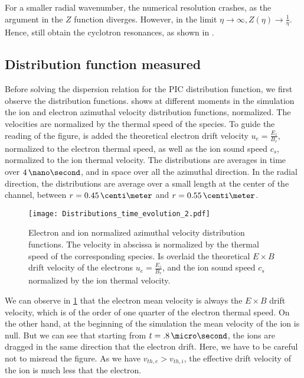     For a smaller radial wavenumber, the numerical resolution crashes, as the argument in the $Z$ function diverges.
    However, in the limit $\eta \rightarrow \infty, Z(\eta) \rightarrow  \frac{1}{\eta}$.
    Hence, still obtain the cyclotron resonances, as shown in \citet[Fig. 2]{janhunen2018}.

  \subsection{Distribution function measured} \label{subsec-VDFpic}
  
  Before solving the dispersion relation for the \ac{PIC} distribution function, we first observe the distribution functions.
   shows at different moments in the simulation the ion and electron azimuthal velocity distribution functions, normalized.
  The velocities are normalized by the thermal speed of the species.
  To guide the reading of the figure, is added the  theoretical electron drift velocity $u_e = \frac{E_z}{B_r}$, normalized to the electron thermal speed, as well as the ion sound speed $c_s$, normalized to the ion thermal velocity.
  The distributions are averages in time over $4\,\nano\second$, and in space over all the azimuthal direction.
  In the radial direction, the distributions are average over a small length at the center of the channel, between $r=0.45\,\centi\meter$ and $r=0.55\,\centi\meter$.
  
  \begin{figure}[hbtp]
    \centering
    \texttt{[image: Distributions\_time\_evolution\_2.pdf]}
    \caption{Electron and ion normalized azimuthal velocity distribution functions. The velocity in abscissa is normalized by the thermal speed of the corresponding species. Is overlaid the theoretical $E\times B$ drift velocity of the electrons $u_e = \frac{E_z}{B_r}$, and the ion sound speed $c_s$ normalized by the ion thermal velocity.}
    \label{fig-vdfs_pic_time}
  \end{figure}
  
  We can observe in \cref{fig-vdfs_pic_time} that the electron mean velocity is always the $E \times B$ drift velocity, which is of the order of one quarter of the electron thermal speed.
  On the other hand, at the beginning of the simulation the mean velocity of the ion is null.
  But we can see that starting from $t=.8\,\micro\second$, the ions are dragged in the same direction that the electron drift.
  Here, we have to be careful not to misread the figure.
  As we have $v_{th, e} > v_{th, i}$, the effective drift velocity of the ion is much less that the electron.
  
